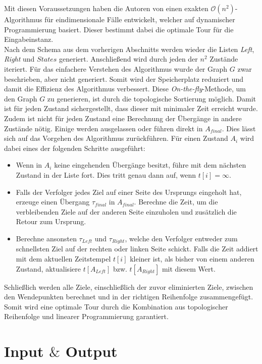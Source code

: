 \documentclass[german,version-2019-11]{uzl-thesis}
\begin{document}
Mit diesen Voraussetzungen haben die Autoren von \cite{helvig} einen exakten $\mathcal{O}(n^2)$-Algorithmus für eindimensionale Fälle entwickelt, welcher auf dynamischer Programmierung basiert. Dieser bestimmt dabei die optimale Tour für die Eingabeinstanz. \\
Nach dem Schema aus dem vorherigen Abschnitts werden wieder die Listen \emph{Left}, \emph{Right} und $States$ generiert. Anschließend wird durch jeden der $n^2$ Zustände iteriert. Für das einfachere Verstehen des Algorithmus wurde der Graph $G$ zwar beschrieben, aber nicht generiert. Somit wird der Speicherplatz reduziert und damit die Effizienz des Algorithmus verbessert. Diese \emph{On-the-fly}-Methode, um den Graph $G$ zu generieren, ist durch die topologische Sortierung möglich. Damit ist für jeden Zustand sichergestellt, dass dieser mit minimaler Zeit erreicht wurde. Zudem ist nicht für jeden Zustand eine Berechnung der Übergänge in andere Zustände nötig. Einige werden ausgelassen oder führen direkt in $A_{final}$. Dies lässt sich auf das Vorgehen des Algorithmus zurückführen. Für einen Zustand $A_i$ wird dabei eines der folgenden Schritte ausgeführt:
\begin{itemize}
\item Wenn in $A_i$ keine eingehenden Übergänge besitzt, führe mit dem nächsten Zustand in der Liste fort. Dies tritt genau dann auf, wenn $t[i] = \infty$.
\item Falls der Verfolger jedes Ziel auf einer Seite des Ursprungs eingeholt hat, erzeuge einen Übergang $\tau_{final}$ in $A_{final}$. Berechne die Zeit, um die verbleibenden Ziele auf der anderen Seite einzuholen und zusätzlich die Retour zum Ursprung. 
\item Berechne ansonsten $\tau_{Left}$ und $\tau_{Right}$, welche den Verfolger entweder zum schnellsten Ziel auf der rechten oder linken Seite schickt. Falls die Zeit addiert mit dem aktuellen Zeitstempel $t[i]$ kleiner ist, als bisher von einem anderen Zustand, aktualisiere $t[A_{Left}]$ bzw. $t[A_{Right}]$ mit diesem Wert.
\end{itemize}
Schließlich werden alle Ziele, einschließlich der zuvor eliminierten Ziele, zwischen den Wendepunkten berechnet und in der richtigen Reihenfolge zusammengefügt. Somit wird eine optimale Tour durch die Kombination aus topologischer Reihenfolge und linearer Programmierung garantiert.

\section{Input $\&$ Output}
\end{document}
